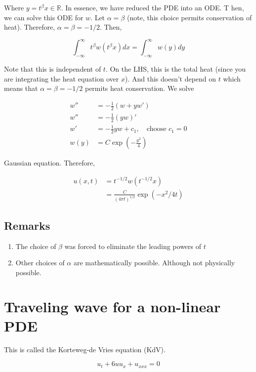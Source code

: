 \documentclass{article}
\newtheorem{one minute paper}[theorem]{One Minute Paper}
\begin{document}
Where $y = t^{\beta} x \in \mathbb{R}$. In essence, we have reduced the PDE into an ODE. T
hen, we can solve this ODE for $w$. Let $\alpha = \beta$ (note, this choice permits conservation of heat). Therefore, $\alpha = \beta = -1/2$. Then, 

\begin{equation}
    \int_{-\infty}^{\infty}t^{\beta}w(t^{\beta}x)dx = \int_{-\infty}^{\infty}w(y)dy
\end{equation}

Note that this is independent of $t$. On the LHS, this is the total heat (since you are integrating the heat equation over $x$). And this doesn't depend on $t$ which means that 
$\alpha = \beta = -1/2$ permits heat conservation. We solve 

\begin{align}
    w'' &= -\frac{1}{2}\left( w + yw' \right)\\
    w'' &= -\frac{1}{2}\left( yw \right)' \\
    w' &= -\frac{1}{2}yw + c_1, \quad \text{choose $c_1 = 0$} \\
    w(y) &= C\exp(-\frac{y^2}{4})
\end{align}

Gaussian equation. Therefore,

\begin{align}
    u(x,t) &= t^{-1/2}w(t^{-1/2}x)\\
    &= \frac{C}{(4\pi t)^{1/2}}\exp(-x^2/4t) 
\end{align}

\subsection*{Remarks}

\begin{enumerate}
    \item The choice of $\beta$ was forced to eliminate the leading powers of $t$
    \item Other choices of $\alpha$ are mathematically possible. Although not physically possible. 
\end{enumerate}

\section*{Traveling wave for a non-linear PDE}

This is called the Korteweg-de Vries equation (KdV). 

\begin{equation}
    u_t + 6uu_{x} + u_{xxx} = 0
\end{equation}
\end{document}
